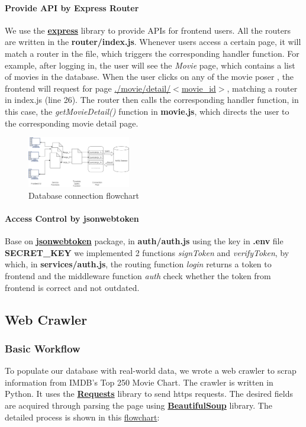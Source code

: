 \begin{CJK*}{UTF8}{gbsn}
\paragraph{Provide API by Express Router}
We use the \textbf{\href{https://expressjs.com}{express}} library to provide APIs for frontend users. All the routers are written in the \textbf{router/index.js}. Whenever users access a certain page, it will match a router in the file, which triggers the corresponding handler function. For example, after logging in, the user will see the \textit{Movie} page, which contains a list of movies in the database. When the user clicks on any of the movie poser , the frontend will request for page \underline{./movie/detail/$<$movie\_id$>$}, matching a router in index.js (line 26). The router then calls the corresponding handler function, in this case, the \textit{getMovieDetail()} function in \textbf{movie.js}, which directs the user to the corresponding movie detail page.
\begin{figure}[h]
    \centering
    \includegraphics[width=0.4\textwidth]{sqlconnect.png}
    \caption{Database connection flowchart}
\end{figure}
\paragraph{Access Control by jsonwebtoken}
\label{sec:access}
Base on \textbf{\href{https://www.npmjs.com/package/jsonwebtoken}{jsonwebtoken}} package, in \textbf{auth/auth.js} using the key in \textbf{.env} file \textbf{SECRET\_KEY} we implemented 2 functions \textit{signToken} and \textit{verifyToken}, by which, in \textbf{services/auth.js}, the routing function \textit{login} returns a token to frontend and the middleware function \textit{auth} check whether the token from frontend is correct and not outdated.

\subsection{Web Crawler}
\subsubsection{Basic Workflow}
To populate our database with real-world data, we wrote a web crawler to scrap information from IMDB's Top 250 Movie Chart. The crawler is written in Python. It uses the \textbf{\href{https://docs.python-requests.org/en/latest/}{Requests}} library to send https requests. The desired fields are acquired through parsing the page using \textbf{\href{https://www.crummy.com/software/BeautifulSoup/bs4/doc/}{BeautifulSoup}} library.
The detailed process is shown in this \hyperref[crawler]{flowchart}:\par


\end{CJK*}
